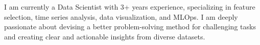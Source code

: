 
\begin{cvparagraph}

I am currently a Data Scientist with 3+ years experience, specializing in feature selection, time series analysis, data visualization, and MLOps. I am deeply passionate about devising a better problem-solving method for challenging tasks and creating clear and actionable insights from diverse datasets.
\end{cvparagraph}

